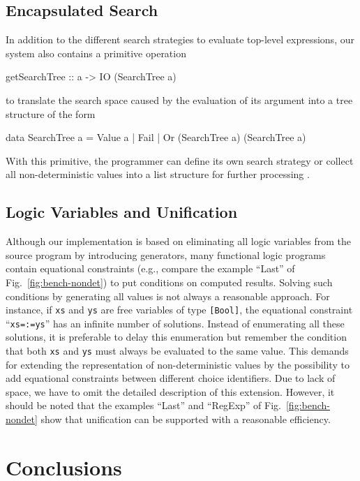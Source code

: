 \documentclass{llncs}
\newcommand{\code}[1]{\mbox{\small\texttt{#1}}}
\newcommand{\ccode}[1]{``\code{#1}''}
\begin{document}
\subsection{Encapsulated Search}

In addition to the different search strategies to evaluate
top-level expressions, our system also contains a primitive operation
\begin{curry}
 getSearchTree :: a -> IO (SearchTree a)
\end{curry}
to translate the search space caused by the evaluation of its argument
into a tree structure of the form
\begin{curry}
 data SearchTree a = Value a | Fail | Or (SearchTree a) (SearchTree a)
\end{curry}
With this primitive,
the programmer can define its own search strategy or
collect all non-deterministic values into a list structure
for further processing \cite{BrasselHuch07}.


\subsection{Logic Variables and Unification}
\label{sec:unification}

Although our implementation is based on eliminating all logic
variables from the source program by introducing generators,
many functional logic programs contain equational constraints
(e.g., compare the example ``Last'' of Fig.~\ref{fig:bench-nondet})
to put conditions on computed results.
Solving such conditions by generating all values is not always
a reasonable approach. For instance, if \code{xs} and \code{ys}
are free variables of type \code{[Bool]}, the equational
constraint \ccode{xs=:=ys} has an infinite number of solutions.
Instead of enumerating all these solutions, it is preferable to
delay this enumeration but remember the condition that both
\code{xs} and \code{ys} must always be evaluated to the same value.
This demands for extending the representation of non-deterministic
values by the possibility to add equational constraints between
different choice identifiers.
Due to lack of space, we have to omit the detailed description
of this extension.
However, it should be noted that the examples
``Last'' and ``RegExp'' of Fig.~\ref{fig:bench-nondet}
show that unification can be supported with a reasonable efficiency.


\section{Conclusions}
\label{sec:Conclusions}
\end{document}
